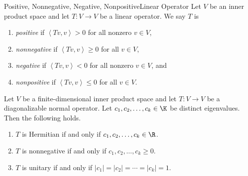 \documentclass[linearalgebraII]{subfiles}
\begin{document}
    \begin{definition}{Positive, Nonnegative, Negative, Nonpositive}{Linear Operator}
        Let $V$ be an inner product space and let $T:V\to V$ be a linear operator. We say $T$ is
        \begin{enumerate}
            \item \emph{positive} if $\left\langle Tv, v\right\rangle > 0$ for all nonzero $v\in V$,
            \item \emph{nonnegative} if $\left\langle Tv, v\right\rangle \geq 0$ for all $v\in V$,
            \item \emph{negative} if $\left\langle Tv, v\right\rangle < 0$ for all nonzero $v\in V$, and
            \item \emph{nonpositive} if $\left\langle Tv, v\right\rangle \leq 0$ for all $v\in V$.
        \end{enumerate}
    \end{definition}

    \begin{prop}{}
        Let $V$ be a finite-dimensional inner product space and let $T:V\to V$ be a diagonalizable normal operator. Let $c_1,c_2,\ldots,c_k\in\K$ be distinct eigenvalues. Then the following holds.
        \begin{enumerate}
            \item $T$ is Hermitian if and only if $c_1,c_2,\ldots,c_k\in\R$.
            \item $T$ is nonnegative if and only if $c_1,c_2,\ldots,c_k\geq 0$.
            \item $T$ is unitary if and only if $\left| c_1 \right| = \left| c_2 \right| =\cdots= \left| c_k \right| = 1$.
        \end{enumerate}
    \end{prop}
\end{document}
